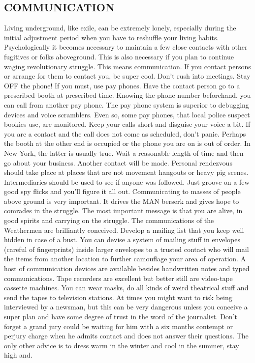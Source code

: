 \documentclass[11pt,twoside,a4paper]{book}
\begin{document}
\subsection{COMMUNICATION}

Living underground, like exile, can be extremely lonely, especially during the initial adjustment period when you have to reshuffle your living habits. Psychologically it becomes necessary to maintain a few close contacts with other fugitives or folks aboveground. This is also necessary if you plan to continue waging revolutionary struggle. This means communication. If you contact persons or arrange for them to contact you, be super cool. Don't rush into meetings. Stay OFF the phone! If you must, use pay phones. Have the contact person go to a prescribed booth at prescribed time. Knowing the phone number beforehand, you can call from another pay phone. The pay phone system is superior to debugging devices and voice scramblers. Even so, some pay phones, that local police suspect bookies use, are monitored. Keep your calls short and disguise your voice a bit. If you are a contact and the call does not come as scheduled, don't panic. Perhaps the booth at the other end is occupied or the phone you are on is out of order. In New York, the latter is usually true. Wait a reasonable length of time and then go about your business. Another contact will be made. Personal rendezvous should take place at places that are not movement hangouts or heavy pig scenes. Intermediaries should be used to see if anyone was followed. Just groove on a few good spy flicks and you'll figure it all out. Communicating to masses of people above ground is very important. It drives the MAN berserk and gives hope to comrades in the struggle. The most important message is that you are alive, in good spirits and carrying on the struggle. The communications of the Weathermen are brilliantly conceived. Develop a mailing list that you keep well hidden in case of a bust. You can devise a system of mailing stuff in envelopes (careful of fingerprints) inside larger envelopes to a trusted contact who will mail the items from another location to further camouflage your area of operation. A host of communication devices are available besides handwritten notes and typed communications. Tape recorders are excellent but better still are video-tape cassette machines. You can wear masks, do all kinds of weird theatrical stuff and send the tapes to television stations. At times you might want to risk being interviewed by a newsman, but this can be very dangerous unless you conceive a super plan and have some degree of trust in the word of the journalist. Don't forget a grand jury could be waiting for him with a six months contempt or perjury charge when he admits contact and does not answer their questions. The only other advice is to dress warm in the winter and cool in the summer, stay high and.
\end{document}
